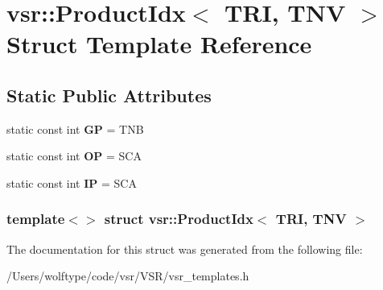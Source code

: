 \hypertarget{structvsr_1_1_product_idx_3_01_t_r_i_00_01_t_n_v_01_4}{\section{vsr\-:\-:Product\-Idx$<$ T\-R\-I, T\-N\-V $>$ Struct Template Reference}
\label{structvsr_1_1_product_idx_3_01_t_r_i_00_01_t_n_v_01_4}
}
\subsection*{Static Public Attributes}
\begin{DoxyCompactItemize}
\item 
\hypertarget{structvsr_1_1_product_idx_3_01_t_r_i_00_01_t_n_v_01_4_a9a92e5826711faed3a4231c293e3be4b}{static const int {\bfseries G\-P} = T\-N\-B}\label{structvsr_1_1_product_idx_3_01_t_r_i_00_01_t_n_v_01_4_a9a92e5826711faed3a4231c293e3be4b}

\item 
\hypertarget{structvsr_1_1_product_idx_3_01_t_r_i_00_01_t_n_v_01_4_ad0c1482ed72d909431ad5aaa2c73e7be}{static const int {\bfseries O\-P} = S\-C\-A}\label{structvsr_1_1_product_idx_3_01_t_r_i_00_01_t_n_v_01_4_ad0c1482ed72d909431ad5aaa2c73e7be}

\item 
\hypertarget{structvsr_1_1_product_idx_3_01_t_r_i_00_01_t_n_v_01_4_a15b219ae513fe50d7421a38fb18e0f82}{static const int {\bfseries I\-P} = S\-C\-A}\label{structvsr_1_1_product_idx_3_01_t_r_i_00_01_t_n_v_01_4_a15b219ae513fe50d7421a38fb18e0f82}

\end{DoxyCompactItemize}
\subsubsection*{template$<$$>$ struct vsr\-::\-Product\-Idx$<$ T\-R\-I, T\-N\-V $>$}



The documentation for this struct was generated from the following file\-:\begin{DoxyCompactItemize}
\item 
/\-Users/wolftype/code/vsr/\-V\-S\-R/vsr\-\_\-templates.\-h\end{DoxyCompactItemize}

